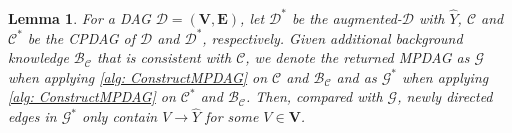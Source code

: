 \documentclass{article} %
\newtheorem{lemma}{Lemma}[section]
\begin{document}



\begin{lemma} \label{lem: cpdag2mpdag}
    For a DAG $\mathcal{D}=(\mathbf{V}, \mathbf{E})$, let $\mathcal{D^{*}}$ be the augmented-$\mathcal{D}$ with $\hat{Y}$, $\mathcal{C}$ and $\mathcal{C^{*}}$ be the CPDAG of $\mathcal{D}$ and $\mathcal{D^{*}}$, respectively. Given additional background knowledge $\mathcal{B_C}$ that is consistent with $\mathcal{C}$, we denote the returned MPDAG as $\mathcal{G}$ when applying \cref{alg: ConstructMPDAG} on $\mathcal{C}$ and $\mathcal{B_C}$ and as $\mathcal{G^{*}}$ when applying \cref{alg: ConstructMPDAG} on $\mathcal{C^{*}}$ and $\mathcal{B_C}$. Then, compared with $\mathcal{G}$, newly directed edges in $\mathcal{G^{*}}$ only contain $V \rightarrow \hat{Y}$ for some $V \in \mathbf{V}$. 
\end{lemma}
\end{document}
